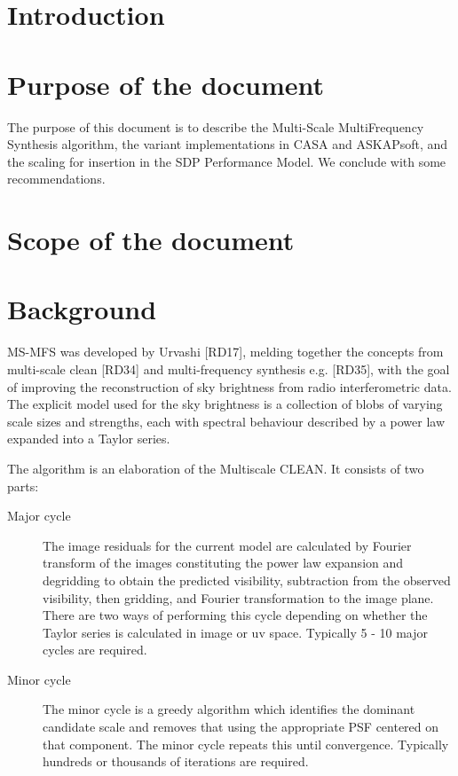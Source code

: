 \documentclass[11pt,a4paper]{article}
\begin{document}
\newpage
\section{Introduction}

\section{Purpose of the document}


The purpose of this document is to describe the Multi-Scale MultiFrequency Synthesis algorithm, the variant implementations in CASA and ASKAPsoft, and the scaling for insertion in the SDP Performance Model. We conclude with some recommendations.

\clearpage
\section{Scope of the document}

\clearpage
\section{Background}

MS-MFS was developed by Urvashi [RD17], melding together the concepts from multi-scale clean [RD34] and multi-frequency synthesis e.g. [RD35], with the goal of improving the reconstruction of sky brightness from radio interferometric data. The explicit model used for the sky brightness is a collection of blobs of varying scale sizes and strengths, each with spectral behaviour described by a power law expanded into a Taylor series.

The algorithm is an elaboration of the Multiscale CLEAN. It consists of two parts:
\begin{description}
\item[Major cycle] The image residuals for the current model are calculated by Fourier transform of the images constituting the power law expansion and degridding to obtain the predicted visibility, subtraction from the observed visibility, then gridding, and Fourier transformation to the image plane. There are two ways of performing this cycle depending on whether the Taylor series is calculated in image or uv space. Typically 5 - 10 major cycles are required.
\item[Minor cycle] The minor cycle is a greedy algorithm which identifies the dominant candidate scale and removes that using the appropriate PSF centered on that component. The minor cycle repeats this until convergence. Typically hundreds or thousands of iterations are required.
\end{description}
\end{document}
